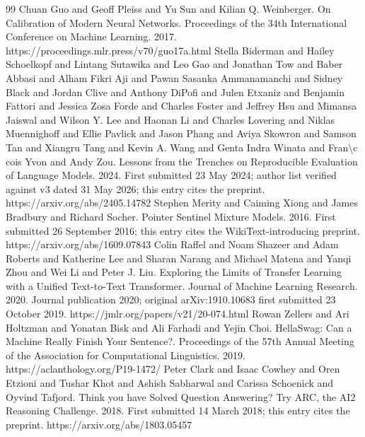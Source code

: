 \documentclass[10pt]{article}
\begin{document}
\begin{thebibliography}{99}
 Chuan Guo and Geoff Pleiss and Yu Sun and Kilian Q. Weinberger. On Calibration of Modern Neural Networks. Proceedings of the 34th International Conference on Machine Learning. 2017. https://proceedings.mlr.press/v70/guo17a.html
 Stella Biderman and Hailey Schoelkopf and Lintang Sutawika and Leo Gao and Jonathan Tow and Baber Abbasi and Alham Fikri Aji and Pawan Sasanka Ammanamanchi and Sidney Black and Jordan Clive and Anthony DiPofi and Julen Etxaniz and Benjamin Fattori and Jessica Zosa Forde and Charles Foster and Jeffrey Hsu and Mimansa Jaiswal and Wilson Y. Lee and Haonan Li and Charles Lovering and Niklas Muennighoff and Ellie Pavlick and Jason Phang and Aviya Skowron and Samson Tan and Xiangru Tang and Kevin A. Wang and Genta Indra Winata and Fran\textbackslash{}c cois Yvon and Andy Zou. Lessons from the Trenches on Reproducible Evaluation of Language Models. 2024. First submitted 23 May 2024; author list verified against v3 dated 31 May 2026; this entry cites the preprint. https://arxiv.org/abs/2405.14782
 Stephen Merity and Caiming Xiong and James Bradbury and Richard Socher. Pointer Sentinel Mixture Models. 2016. First submitted 26 September 2016; this entry cites the WikiText-introducing preprint. https://arxiv.org/abs/1609.07843
 Colin Raffel and Noam Shazeer and Adam Roberts and Katherine Lee and Sharan Narang and Michael Matena and Yanqi Zhou and Wei Li and Peter J. Liu. Exploring the Limits of Transfer Learning with a Unified Text-to-Text Transformer. Journal of Machine Learning Research. 2020. Journal publication 2020; original arXiv:1910.10683 first submitted 23 October 2019. https://jmlr.org/papers/v21/20-074.html
 Rowan Zellers and Ari Holtzman and Yonatan Bisk and Ali Farhadi and Yejin Choi. HellaSwag: Can a Machine Really Finish Your Sentence?. Proceedings of the 57th Annual Meeting of the Association for Computational Linguistics. 2019. https://aclanthology.org/P19-1472/
 Peter Clark and Isaac Cowhey and Oren Etzioni and Tushar Khot and Ashish Sabharwal and Carissa Schoenick and Oyvind Tafjord. Think you have Solved Question Answering? Try ARC, the AI2 Reasoning Challenge. 2018. First submitted 14 March 2018; this entry cites the preprint. https://arxiv.org/abs/1803.05457
\end{thebibliography}
\end{document}
